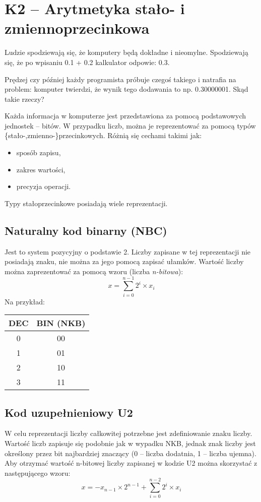 \sloppy\section{K2 -- Arytmetyka stało- i zmiennoprzecinkowa}

Ludzie spodziewają się, że komputery będą dokładne i nieomylne.
Spodziewają się, że po wpisaniu 0.1 + 0.2 kalkulator odpowie: 0.3.

Prędzej czy później każdy programista próbuje czegoś takiego i natrafia na problem: komputer twierdzi, że wynik tego dodawania to np. 0.30000001.
Skąd takie rzeczy?


Każda informacja w komputerze jest przedstawiona za pomocą podstawowych jednostek -- bitów. W przypadku liczb, można je reprezentować za pomocą typów \{stało-,zmienno-\}przecinkowych. Różnią się cechami takimi jak:
\begin{itemize}
\item sposób zapisu,
\item zakres wartości,
\item precyzja operacji.
\end{itemize}

Typy stałoprzecinkowe posiadają wiele reprezentacji. 

\subsection{Naturalny kod binarny (NBC)}
Jest to system pozycyjny o podstawie 2. Liczby zapisane w tej reprezentacji nie posiadają znaku, nie można za jego pomocą zapisać ułamków. Wartość liczby można zaprezentować za pomocą wzoru (liczba \textit{n-bitowa}):
\begin{equation}
x = \sum_{i=0}^{n-1}2^{i} \times x_{i}
\end{equation}
Na przykład:
\begin{table}[H]
\centering
\begin{tabular}{|c|c|} \hline
DEC	&	BIN (NKB)	\\ \hline
0	&	00	\\ \hline
1	&	01	\\ \hline
2	&	10	\\ \hline
3	&	11	\\ \hline
\end{tabular}
\end{table}

\subsection{Kod uzupełnieniowy U2}
W celu reprezentacji liczby całkowitej potrzebne jest zdefiniowanie znaku liczby. Wartość liczb zapisuje się podobnie jak w wypadku NKB, jednak znak liczby jest określony przez bit najbardziej znaczący (0 -- liczba dodatnia, 1 -- liczba ujemna).
Aby otrzymać wartość n-bitowej liczby zapisanej w kodzie U2 można skorzystać z następującego wzoru:
\begin{equation}
x = -x_{n-1}\times 2^{n-1}+\sum_{i=0}^{n-2}2^{i} \times x_{i}
\end{equation}

